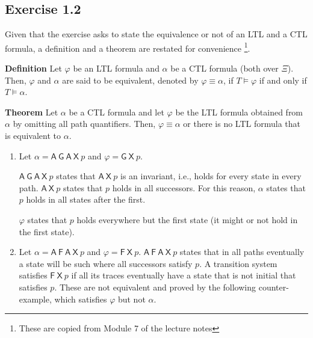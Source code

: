 \documentclass[12pt]{article}
\newcommand{\drafter}[1]{#1}
\begin{document}
\begin{enumerate}[label=\roman*.]
\subsection*{Exercise 1.2}

\drafter{Given that the exercise asks to state the equivalence or not of an LTL and a CTL formula, a definition and a theorem are restated for convenience \footnote{These are copied from Module 7 of the lecture notes}.}

\drafter{\textbf{Definition} Let $\varphi$ be an LTL formula and $\alpha$ be a CTL formula (both over $\Xi$). Then, $\varphi$ and $\alpha$ are said to be equivalent, denoted by $\varphi \equiv \alpha$, if $T \models \varphi$ if and only if $T \models \alpha$.}

\drafter{\textbf{Theorem} Let $\alpha$ be a CTL formula and let $\varphi$ be the LTL formula obtained from $\alpha$ by omitting all path quantifiers. Then, $\varphi \equiv \alpha$ or there is no LTL formula that is equivalent to $\alpha$.}

\begin{enumerate}[label=(\alph*)]
  \item Let $\alpha = \mathsf{A}~\mathsf{G}~\mathsf{A}~\mathsf{X}~p$ and $\varphi = \mathsf{G}~\mathsf{X}~p$.

    $\mathsf{A}~\mathsf{G}~\mathsf{A}~\mathsf{X}~p$ states that $\mathsf{A}~\mathsf{X}~p$ is an invariant, i.e., holds for every state in every path.
    $\mathsf{A}~\mathsf{X}~p$ states that $p$ holds in all successors.
    For this reason, $\alpha$ states that $p$ holds in all states after the first.

    $\varphi$ states that $p$ holds everywhere but the first state (it might or not hold in the first state).

  \item Let $\alpha = \mathsf{A}~\mathsf{F}~\mathsf{A}~\mathsf{X}~p$ and $\varphi = \mathsf{F}~\mathsf{X}~p$.
    $\mathsf{A}~\mathsf{F}~\mathsf{A}~\mathsf{X}~p$ states that in all paths eventually a state will be such where all successors satisfy $p$.
    A transition system satisfies $\mathsf{F}~\mathsf{X}~p$ if all its traces eventually have a state that is not initial that satisfies $p$.
    These are not equivalent and proved by the following counter-example, which satisfies $\varphi$ but not $\alpha$.

    \begin{figure}[ht]
      \centering
\end{figure}
\end{enumerate}
\end{enumerate}
\end{document}
